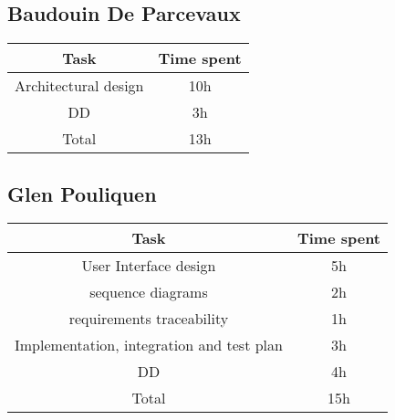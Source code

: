 \subsection{Baudouin De Parcevaux}
\begin{tabular}{| c | c | }
	\hline
	\textbf{Task} & \textbf{Time spent} \\ 
	\hline\hline
 	Architectural design & 10h\\
 	DD & 3h\\
	\hline
	Total & 13h \\
	\hline
\end{tabular}

\subsection{Glen Pouliquen}
\begin{tabular}{| c | c | }
	\hline
	\textbf{Task} & \textbf{Time spent} \\ 
	\hline\hline
	User Interface design& 5h\\
	sequence diagrams& 2h\\
	requirements traceability & 1h\\
	Implementation, integration and test plan& 3h\\
	DD & 4h\\
	\hline
	Total & 15h \\
	\hline
\end{tabular}